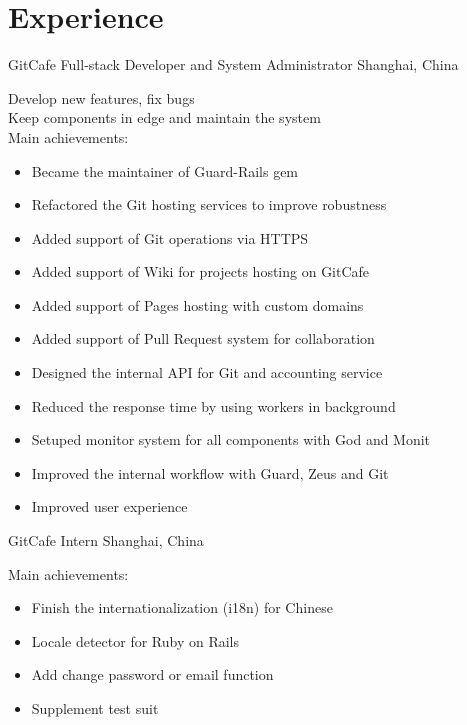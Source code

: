 \documentclass[]{friggeri-cv} %
\begin{document}

\section{Experience}

\begin{entrylist}
  {GitCafe \textnormal{Full-stack Developer and System Administrator}}
  {Shanghai, China}
  {
    Develop new features, fix bugs\\
    Keep components in edge and maintain the system\\
    Main achievements:
    \begin{itemize}
    \item Became the maintainer of Guard-Rails gem
    \item Refactored the Git hosting services to improve robustness
    \item Added support of Git operations via HTTPS
    \item Added support of Wiki for projects hosting on GitCafe
    \item Added support of Pages hosting with custom domains
    \item Added support of Pull Request system for collaboration
    \item Designed the internal API for Git and accounting service
    \item Reduced the response time by using workers in background
    \item Setuped monitor system for all components with God and Monit
    \item Improved the internal workflow with Guard, Zeus and Git
    \item Improved user experience
    \end{itemize}
  }
  {GitCafe \textnormal{Intern}}
  {Shanghai, China}
  {
    Main achievements:
    \begin{itemize}
    \item Finish the internationalization (i18n) for Chinese
    \item Locale detector for Ruby on Rails
    \item Add change password or email function
    \item Supplement test suit
    \end{itemize}
  }
\end{entrylist}
\end{document}
